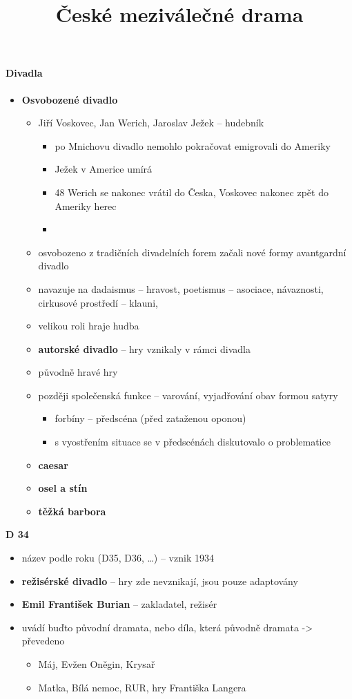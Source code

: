 \title{České meziválečné drama}


\paragraph{Divadla}
	\begin{itemize}
	\item \textbf{Osvobozené divadlo}
		\begin{itemize}
		\item Jiří Voskovec, Jan Werich, Jaroslav Ježek -- hudebník
			\begin{itemize}
			\item po Mnichovu divadlo nemohlo pokračovat \ra emigrovali do Ameriky
			\item Ježek v Americe umírá
			\item 48 Werich se nakonec vrátil do Česka, Voskovec nakonec zpět do Ameriky \ra herec
			\item  
			\end{itemize}
		\item osvobozeno z tradičních divadelních forem \ra začali nové formy \ra avantgardní divadlo
		\item navazuje na dadaismus -- hravost, poetismus -- asociace, návaznosti, cirkusové prostředí -- klauni, 
		\item velikou roli hraje hudba
		\item \textbf{autorské divadlo} -- hry vznikaly v rámci divadla
		\item původně hravé hry
		\item později společenská funkce -- varování, vyjadřování obav formou satyry
			\begin{itemize}
			\item forbíny -- předscéna (před zataženou oponou)
			\item s vyostřením situace se v předscénách diskutovalo o problematice
			\end{itemize}
		\item \textbf{caesar}
		\item \textbf{osel a stín}
		\item \textbf{těžká barbora}
		\end{itemize}
	\end{itemize}
\item \textbf{D 34}
	\begin{itemize}
	\item název podle roku (D35, D36, \ldots) -- vznik 1934
	\item \textbf{režisérské divadlo} -- hry zde nevznikají, jsou pouze adaptovány
	\item \textbf{Emil František Burian} -- zakladatel, režisér
	\item uvádí buďto původní dramata, nebo díla, která původně dramata -> převedeno
		\begin{itemize}
		\item Máj, Evžen Oněgin, Krysař
		\item Matka, Bílá nemoc, RUR, hry Františka Langera
		\end{itemize}
	\end{itemize}

